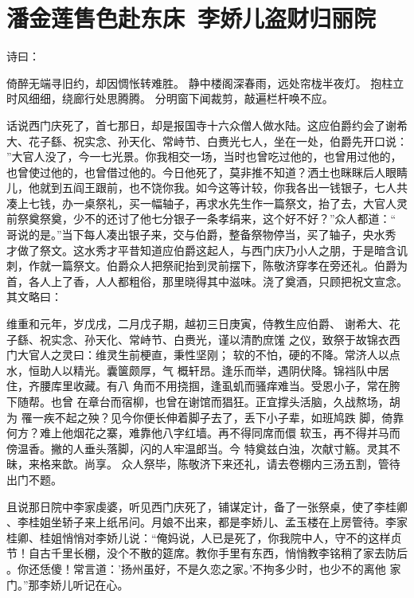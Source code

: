 \chapter{潘金莲售色赴东床~李娇儿盗财归丽院}

诗曰：

倚醉无端寻旧约，却因惆怅转难胜。
静中楼阁深春雨，远处帘栊半夜灯。
抱柱立时风细细，绕廊行处思腾腾。
分明窗下闻裁剪，敲遍栏杆唤不应。

话说西门庆死了，首七那日，却是报国寺十六众僧人做水陆。这应伯爵约会了谢希
大、花子繇、祝实念、孙天化、常峙节、白赉光七人，坐在一处，伯爵先开口说：
”大官人没了，今一七光景。你我相交一场，当时也曾吃过他的，也曾用过他的，
也曾使过他的，也曾借过他的。今日他死了，莫非推不知道？洒土也眯眯后人眼睛
儿，他就到五阎王跟前，也不饶你我。如今这等计较，你我各出一钱银子，七人共
凑上七钱，办一桌祭礼，买一幅轴子，再求水先生作一篇祭文，抬了去，大官人灵
前祭奠祭奠，少不的还讨了他七分银子一条孝绢来，这个好不好？”众人都道：“
哥说的是。”当下每人凑出银子来，交与伯爵，整备祭物停当，买了轴子，央水秀
才做了祭文。这水秀才平昔知道应伯爵这起人，与西门庆乃小人之朋，于是暗含讥
刺，作就一篇祭文。伯爵众人把祭祀抬到灵前摆下，陈敬济穿孝在旁还礼。伯爵为
首，各人上了香，人人都粗俗，那里晓得其中滋味。浇了奠酒，只顾把祝文宣念。
其文略曰：

维重和元年，岁戊戌，二月戊子期，越初三日庚寅，侍教生应伯爵、
谢希大、花子繇、祝实念、孙天化、常峙节、白赉光，谨以清酌庶馐
之仪，致祭于故锦衣西门大官人之灵曰：维灵生前梗直，秉性坚刚；
软的不怕，硬的不降。常济人以点水，恒助人以精光。囊箧颇厚，气
概轩昂。逢乐而举，遇阴伏降。锦裆队中居住，齐腰库里收藏。有八
角而不用挠掴，逢虱虮而骚痒难当。受恩小子，常在胯下随帮。也曾
在章台而宿柳，也曾在谢馆而猖狂。正宜撑头活脑，久战熬场，胡为
罹一疾不起之殃？见今你便长伸着脚子去了，丢下小子辈，如班鸠跌
脚，倚靠何方？难上他烟花之寨，难靠他八字红墙。再不得同席而儇
软玉，再不得并马而傍温香。撇的人垂头落脚，闪的人牢温郎当。今
特奠兹白浊，次献寸觞。灵其不昧，来格来歆。尚享。
众人祭毕，陈敬济下来还礼，请去卷棚内三汤五割，管待出门不题。

且说那日院中李家虔婆，听见西门庆死了，铺谋定计，备了一张祭桌，使了李桂卿
、李桂姐坐轿子来上纸吊问。月娘不出来，都是李娇儿、孟玉楼在上房管待。李家
桂卿、桂姐悄悄对李娇儿说：“俺妈说，人已是死了，你我院中人，守不的这样贞
节！自古千里长棚，没个不散的筵席。教你手里有东西，悄悄教李铭稍了家去防后
。你还恁傻！常言道：'扬州虽好，不是久恋之家。'不拘多少时，也少不的离他
家门。”那李娇儿听记在心。

